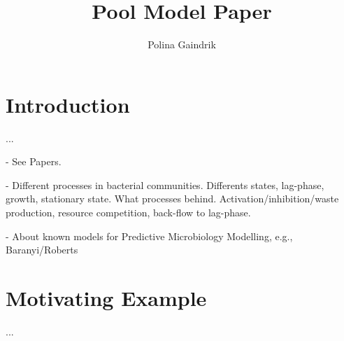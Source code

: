\documentclass[10pt,A4paper]{article}
\title{Pool Model Paper}
\author{Polina Gaindrik}
\begin{document}
\maketitle

\tableofcontents

\newpage

\section{Introduction}

...

- See Papers.

- Different processes in bacterial communities. 
Differents states, lag-phase, growth, stationary state. What processes behind.
Activation/inhibition/waste production, resource competition, back-flow to lag-phase.

- About known models for Predictive Microbiology Modelling, e.g., Baranyi/Roberts

\section{Motivating Example}

...


\end{document}

